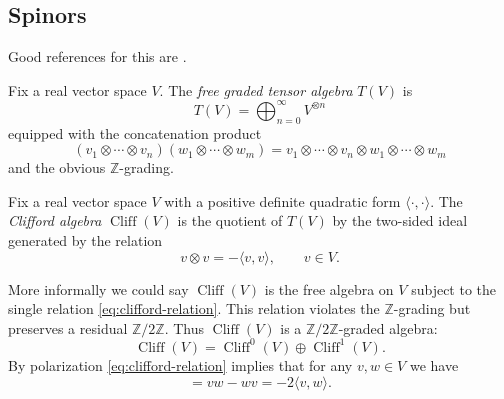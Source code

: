 \documentclass[12pt,letterpaper,reqno]{article}
\numberwithin{equation}{section}
\newcommand{\Z}{\ensuremath{\mathbb Z}}
\newcommand{\IP}[1]{\langle#1\rangle}
\newcommand{\ti}[1]{\textit{#1}}
\DeclareMathOperator{\Cliff}{Cliff}
\begin{document}
\subsection{Spinors} \label{app:spinors}

Good references for this are \cite{MR1031992,MR1367507}.

\begin{defn} Fix a real vector space $V$. The
\ti{free graded tensor algebra} $T(V)$ is
\begin{equation}
  T(V) = \bigoplus_{n=0}^\infty V^{\otimes n}
\end{equation}
equipped with the concatenation product
\begin{equation}
  (v_1 \otimes \cdots \otimes v_n) (w_1 \otimes \cdots \otimes w_m) = v_1 \otimes \cdots \otimes v_n \otimes w_1 \otimes \cdots \otimes w_m
\end{equation}
and the obvious $\Z$-grading.
\end{defn}

\begin{defn} Fix a real vector space $V$ with a positive definite
quadratic form $\IP{\cdot,\cdot}$. The \ti{Clifford algebra} $\Cliff(V)$ is the quotient
of $T(V)$ by the two-sided ideal generated by the relation
\begin{equation} \label{eq:clifford-relation}
  v \otimes v = -\IP{v,v}, \qquad v \in V.
\end{equation}
\end{defn}
More informally we could say $\Cliff(V)$ is the free algebra on $V$
subject to the single relation \eqref{eq:clifford-relation}.
This relation violates the $\Z$-grading but preserves a residual $\Z/2\Z$.
Thus $\Cliff(V)$ is a $\Z/2\Z$-graded algebra:
\begin{equation}
  \Cliff(V) = \Cliff^0(V) \oplus \Cliff^1(V).
\end{equation}
By polarization \eqref{eq:clifford-relation} implies that for any $v, w \in V$ we have
\begin{equation}
  [v,w] = v w - w v = -2 \IP{v,w}.
\end{equation}

\end{document}
